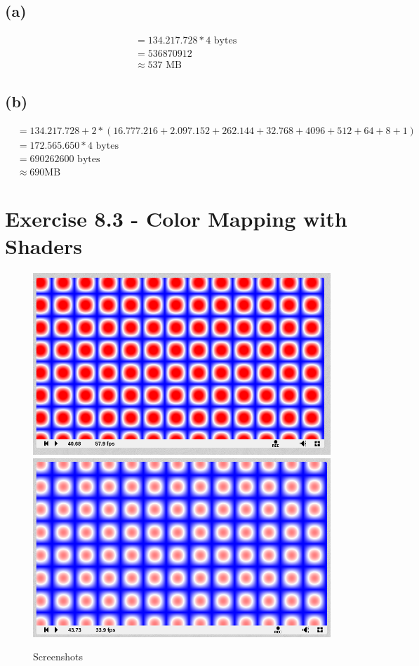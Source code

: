 \documentclass[a4paper]{article}
\begin{document}
\subsection*{(a)}
\begin{align*}
&= 134.217.728 * 4 \text{ bytes}\\
&= 536870912\\
&\approx 537\text{ MB}
\end{align*}
\subsection*{(b)}
\begin{align*}
&= 134.217.728 + 2*(16.777.216 + 2.097.152 + 262.144 + 32.768 + 4096 + 512 + 64 + 8 + 1)\\
&= 172.565.650 * 4 \text{ bytes} \\
&= 690262600 \text{ bytes}\\
&\approx 690 \text{MB}
\end{align*}

\newpage
\section*{Exercise 8.3 - Color Mapping with Shaders}

\begin{figure}[!ht]
	\centering
	\includegraphics[width=0.7\linewidth]{Screenshot-2019-06-04_142043}
	\includegraphics[width=0.7\linewidth]{Screenshot-2019-06-04_142159}
	\caption{Screenshots}
	\label{fig:screenshot-2019-06-04142043}
\end{figure}
\end{document}
